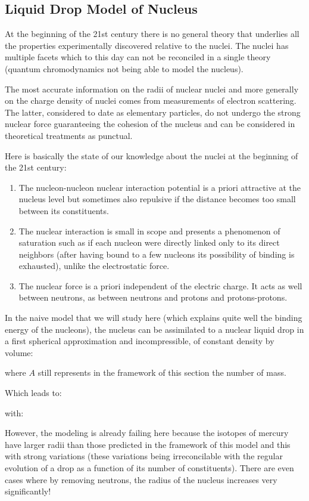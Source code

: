 	\pagebreak
	\subsection{Liquid Drop Model of Nucleus}\label{liquid drop model}
	At the beginning of the 21st century there is no general theory that underlies all the properties experimentally discovered relative to the nuclei. The nuclei has multiple facets which to this day can not be reconciled in a single theory (quantum chromodynamics not being able to model the nucleus).

	The most accurate information on the radii of nuclear nuclei and more generally on the charge density of nuclei comes from measurements of electron scattering. The latter, considered to date as elementary particles, do not undergo the strong nuclear force guaranteeing the cohesion of the nucleus and can be considered in theoretical treatments as punctual.

	Here is basically the state of our knowledge about the nuclei at the beginning of the 21st century:
	\begin{enumerate}
		\item The nucleon-nucleon nuclear interaction potential is a priori attractive at the nucleus level but sometimes also repulsive if the distance becomes too small between its constituents.

		\item The nuclear interaction is small in scope and presents a phenomenon of saturation such as if each nucleon were directly linked only to its direct neighbors (after having bound to a few nucleons its possibility of binding is exhausted), unlike  the electrostatic force.

		\item The nuclear force is a priori independent of the electric charge. It acts as well between neutrons, as between neutrons and protons and protons-protons.
	\end{enumerate}
	In the naive model that we will study here (which explains quite well the binding energy of the nucleons), the nucleus can be assimilated to a nuclear liquid drop in a first spherical approximation and incompressible, of constant density by volume:
	
	where $A$ still represents in the framework of this section the number of mass.

	Which leads to:
	
	with:
	
	However, the modeling is already failing here because the isotopes of mercury have larger radii than those predicted in the framework of this model and this with strong variations (these variations being irreconcilable with the regular evolution of a drop as a function of its number of constituents). There are even cases where by removing neutrons, the radius of the nucleus increases very significantly!

